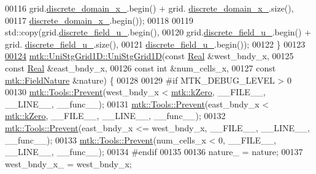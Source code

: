 \begin{DoxyCode}
00116               grid.\hyperlink{classmtk_1_1UniStgGrid1D_a0a1f9c00e21659e05f414dd97e2a52e3}{discrete\_domain\_x\_}.begin() + grid.
      \hyperlink{classmtk_1_1UniStgGrid1D_a0a1f9c00e21659e05f414dd97e2a52e3}{discrete\_domain\_x\_}.size(),
00117               \hyperlink{classmtk_1_1UniStgGrid1D_a0a1f9c00e21659e05f414dd97e2a52e3}{discrete\_domain\_x\_}.begin());
00118 
00119     std::copy(grid.\hyperlink{classmtk_1_1UniStgGrid1D_a9a1e7c4ff7f83787a1844d8b24af8045}{discrete\_field\_u\_}.begin(),
00120               grid.\hyperlink{classmtk_1_1UniStgGrid1D_a9a1e7c4ff7f83787a1844d8b24af8045}{discrete\_field\_u\_}.begin() + grid.
      \hyperlink{classmtk_1_1UniStgGrid1D_a9a1e7c4ff7f83787a1844d8b24af8045}{discrete\_field\_u\_}.size(),
00121               \hyperlink{classmtk_1_1UniStgGrid1D_a9a1e7c4ff7f83787a1844d8b24af8045}{discrete\_field\_u\_}.begin());
00122 \}
00123 
\hypertarget{mtk__uni__stg__grid__1d_8cc_source_l00124}{}\hyperlink{classmtk_1_1UniStgGrid1D_ae19250f0cddef7a05c4a73a90991a26a}{00124} \hyperlink{classmtk_1_1UniStgGrid1D_ab0c1bb8afad2420fdb4434eb21bdec82}{mtk::UniStgGrid1D::UniStgGrid1D}(\textcolor{keyword}{const} \hyperlink{group__c01-roots_gac080bbbf5cbb5502c9f00405f894857d}{Real} &west\_bndy\_x,
00125                                 \textcolor{keyword}{const} \hyperlink{group__c01-roots_gac080bbbf5cbb5502c9f00405f894857d}{Real} &east\_bndy\_x,
00126                                 \textcolor{keyword}{const} \textcolor{keywordtype}{int} &num\_cells\_x,
00127                                 \textcolor{keyword}{const} \hyperlink{group__c02-enums_ga4c54f2a329cfb4e56213b02a259d19e2}{mtk::FieldNature} &nature) \{
00128 
00129 \textcolor{preprocessor}{  #if MTK\_DEBUG\_LEVEL > 0}
00130   \hyperlink{classmtk_1_1Tools_a332324c6f25e66be9dff48c5987a3b9f}{mtk::Tools::Prevent}(west\_bndy\_x < \hyperlink{group__c01-roots_ga59a451a5fae30d59649bcda274fea271}{mtk::kZero}, \_\_FILE\_\_, \_\_LINE\_\_, \_\_func\_\_);
00131   \hyperlink{classmtk_1_1Tools_a332324c6f25e66be9dff48c5987a3b9f}{mtk::Tools::Prevent}(east\_bndy\_x < \hyperlink{group__c01-roots_ga59a451a5fae30d59649bcda274fea271}{mtk::kZero}, \_\_FILE\_\_, \_\_LINE\_\_, \_\_func\_\_);
00132   \hyperlink{classmtk_1_1Tools_a332324c6f25e66be9dff48c5987a3b9f}{mtk::Tools::Prevent}(east\_bndy\_x <= west\_bndy\_x, \_\_FILE\_\_, \_\_LINE\_\_, \_\_func\_\_);
00133   \hyperlink{classmtk_1_1Tools_a332324c6f25e66be9dff48c5987a3b9f}{mtk::Tools::Prevent}(num\_cells\_x < 0, \_\_FILE\_\_, \_\_LINE\_\_, \_\_func\_\_);
00134 \textcolor{preprocessor}{  #endif}
00135 
00136   nature\_ = nature;
00137   west\_bndy\_x\_ = west\_bndy\_x;

\end{DoxyCode}
